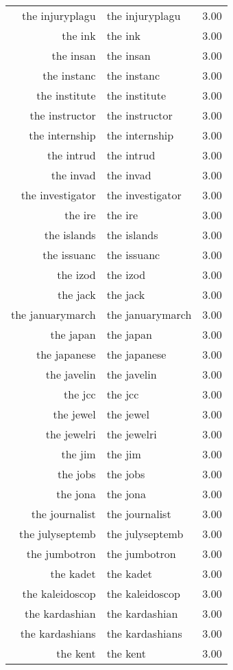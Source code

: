 \begin{table}[ht]
\begin{tabular}{rlr}
  the injuryplagu & the injuryplagu & 3.00 \\ 
  the ink & the ink & 3.00 \\ 
  the insan & the insan & 3.00 \\ 
  the instanc & the instanc & 3.00 \\ 
  the institute & the institute & 3.00 \\ 
  the instructor & the instructor & 3.00 \\ 
  the internship & the internship & 3.00 \\ 
  the intrud & the intrud & 3.00 \\ 
  the invad & the invad & 3.00 \\ 
  the investigator & the investigator & 3.00 \\ 
  the ire & the ire & 3.00 \\ 
  the islands & the islands & 3.00 \\ 
  the issuanc & the issuanc & 3.00 \\ 
  the izod & the izod & 3.00 \\ 
  the jack & the jack & 3.00 \\ 
  the januarymarch & the januarymarch & 3.00 \\ 
  the japan & the japan & 3.00 \\ 
  the japanese & the japanese & 3.00 \\ 
  the javelin & the javelin & 3.00 \\ 
  the jcc & the jcc & 3.00 \\ 
  the jewel & the jewel & 3.00 \\ 
  the jewelri & the jewelri & 3.00 \\ 
  the jim & the jim & 3.00 \\ 
  the jobs & the jobs & 3.00 \\ 
  the jona & the jona & 3.00 \\ 
  the journalist & the journalist & 3.00 \\ 
  the julyseptemb & the julyseptemb & 3.00 \\ 
  the jumbotron & the jumbotron & 3.00 \\ 
  the kadet & the kadet & 3.00 \\ 
  the kaleidoscop & the kaleidoscop & 3.00 \\ 
  the kardashian & the kardashian & 3.00 \\ 
  the kardashians & the kardashians & 3.00 \\ 
  the kent & the kent & 3.00 \\ 

\end{tabular}
\end{table}
